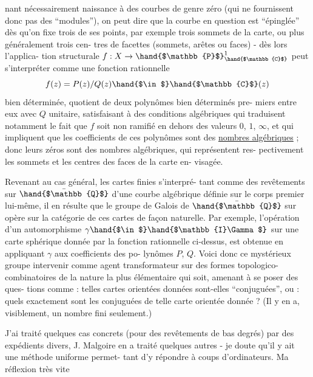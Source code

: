 
nant nécessairement naissance à des courbes de genre zéro (qui ne
fournissent donc pas des ``modules''), on peut dire que la courbe
en question est ``épinglée'' dès qu'on fixe trois de ses points, par
exemple trois sommets de la carte, ou plus généralement trois cen-%
tres de facettes (sommets, arêtes ou faces) - dès lors l'applica-%
tion structurale $f : X \to \hand{$\mathbb{P}$}^{1}_{\hand{$\mathbb{C}$}}$ peut s'interpréter comme une fonction
rationnelle
\[ f(z) = P(z)/Q(z) \hand{$\in$} \hand{$\mathbb{C}$}(z) \]
bien déterminée, quotient de deux polynômes bien déterminés pre-%
miers entre eux avec $Q$ unitaire, satisfaisant à des conditions
algébriques qui traduisent notamment le fait que $f$ soit non
ramifié en dehors des valeurs $0$, $1$, $\infty$, et qui impliquent que les
coefficients de ces polynômes sont des \uline{nombres algébriques} ; donc
leurs zéros sont des nombres algébriques, qui représentent res-%
pectivement les sommets et les centres des faces de la carte en-%
visagée.

Revenant au cas général, les cartes finies s'interpré-%
tant comme des revêtements sur $\bar{\hand{$\mathbb{Q}$}}$ d'une courbe algébrique définie
sur le corps premier  lui-même, il en résulte que le groupe de
Galois  de $\bar{\hand{$\mathbb{Q}$}}$ sur  opère sur la catégorie de ces cartes de
façon naturelle. Par exemple, l'opération d'un automorphisme
$\gamma \hand{$\in$} \hand{$\mathbb{I}\Gamma$}$ sur une carte sphérique donnée par la fonction rationnelle
ci-dessus, est obtenue en appliquant $\gamma$ aux coefficients des po-%
lynômes $P$, $Q$. Voici donc ce mystérieux groupe  intervenir comme
agent transformateur sur des formes topologico-combinatoires de la
nature la plus élémentaire qui soit, amenant à se poser des ques-%
tions comme : telles cartes orientées données sont-elles ``conjuguées'',
ou : quels exactement sont les conjuguées de telle carte orientée
donnée ? (Il y en a, visiblement, un nombre fini seulement.)

J'ai traité quelques cas concrets (pour des revêtements
de bas degrés) par des expédients divers, J. Malgoire en a traité
quelques autres - je doute qu'il y ait une méthode uniforme permet-%
tant d'y répondre à coups d'ordinateurs. Ma réflexion très vite

